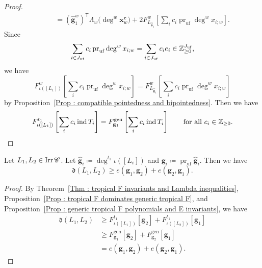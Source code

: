 \begin{proof}
\[\begin{aligned}
&\qquad = (\widehat{\mathbf{g}}_1^{w})^{\mathsf{T}}
\Lambda_{w}
\bigl(\deg^{w}\mathbf{x}_{w}^{\mathbf{c}}\bigr)
+ 2F^{w}_{L_{\widehat{\mathbf{g}}_1}}
\left[\sum_i c_i\operatorname{pr}_{\mathrm{uf}}
\deg^{w}x_{i;w}\right].
\end{aligned}
\]
Since
\[
\sum_{i \in J_{\mathrm{uf}}}c_i\operatorname{pr}_{\mathrm{uf}}
\deg^{w}x_{i;w}
= \sum_{i \in J_{\mathrm{uf}}}c_i e_i
\in \mathbb{Z}_{\geq 0}^{J_{\mathrm{uf}}},
\]
we have
\[
F^{w}_{\iota([L_1])}
\left[\sum_i c_i\operatorname{pr}_{\mathrm{uf}}
\deg^{w}x_{i;w}\right]
= F^{w}_{L_{\widehat{\mathbf{g}}_1}}
\left[\sum_i c_i\operatorname{pr}_{\mathrm{uf}}
\deg^{w}x_{i;w}\right]
\]
by Proposition~\ref{Prop : compatible pointedness and bipointedness}.
Then we have
\[
F^{t_1}_{\iota([L_1])}
\left[\sum_i c_i\operatorname{ind}T_i\right]
= F^{\mathrm{gen}}_{\mathbf{g}_1}
\left[\sum_i c_i\operatorname{ind}T_i\right]
\qquad\text{for all }c_i \in \mathbb{Z}_{\geq 0}.
\]
\end{proof}

\begin{Cor}
\label{Cor : d dominates generic extensions}
Let $L_1, L_2 \in \mathop{\mathrm{Irr}}\nolimits\mathscr{C}$.
Let $\widehat{\mathbf{g}}_i
\coloneq \deg^{t_1}\iota([L_i])$ and
$\mathbf{g}_i
\coloneq \operatorname{pr}_{\mathrm{uf}}\widehat{\mathbf{g}}_i$.
Then we have
\[
\mathfrak{d}(L_1, L_2)
\geq e(\mathbf{g}_1, \mathbf{g}_2)
+ e(\mathbf{g}_2, \mathbf{g}_1).
\]
\end{Cor}

\begin{proof}
By Theorem~\ref{Thm : tropical F invariants and Lambda inequalities},
Proposition~\ref{Prop : tropical F dominates generic tropical F}, and
Proposition~\ref{Prop : generic tropical F polynomials and E invariants}, we
have
\[
\begin{aligned}
\mathfrak{d}(L_1, L_2)
&\geq F^{t_1}_{\iota([L_1])}[\mathbf{g}_2]
+ F^{t_1}_{\iota([L_2])}[\mathbf{g}_1] \\
&\geq F^{\mathrm{gen}}_{\mathbf{g}_1}[\mathbf{g}_2]
+ F^{\mathrm{gen}}_{\mathbf{g}_2}[\mathbf{g}_1] \\
&= e(\mathbf{g}_1, \mathbf{g}_2)
+ e(\mathbf{g}_2, \mathbf{g}_1).
\end{aligned}
\]
\end{proof}

